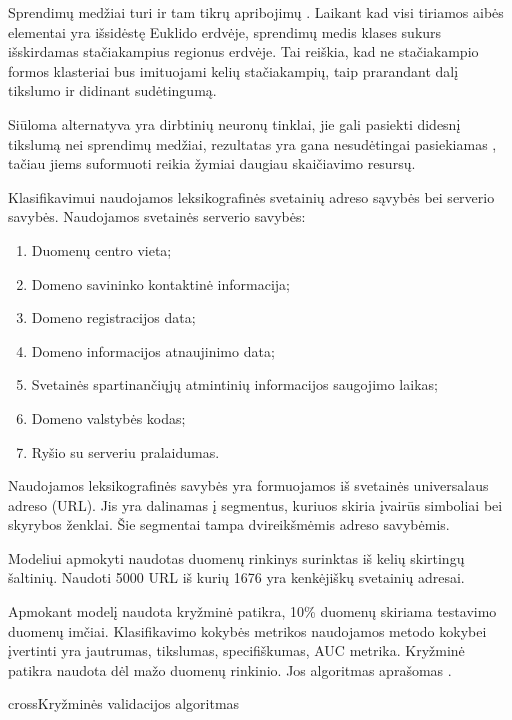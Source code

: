 Sprendimų medžiai turi ir tam tikrų apribojimų \cite{c45}. Laikant kad visi tiriamos aibės elementai yra išsidėstę Euklido erdvėje, sprendimų medis klases sukurs išskirdamas stačiakampius regionus erdvėje. Tai reiškia, kad ne stačiakampio formos klasteriai bus imituojami kelių stačiakampių, taip prarandant dalį tikslumo ir didinant sudėtingumą.

Siūloma alternatyva \cite{c45} yra dirbtinių neuronų tinklai, jie gali pasiekti didesnį tikslumą nei sprendimų medžiai, rezultatas yra gana nesudėtingai pasiekiamas \cite{c45}, tačiau jiems suformuoti reikia žymiai daugiau skaičiavimo resursų.

Klasifikavimui naudojamos leksikografinės svetainių adreso sąvybės bei serverio savybės. Naudojamos svetainės serverio savybės:
\begin{enumerate}[label=\arabic*.]
    \item Duomenų centro vieta;
    \item Domeno savininko kontaktinė informacija;
    \item Domeno registracijos data;
    \item Domeno informacijos atnaujinimo data;
    \item Svetainės spartinančiųjų atmintinių informacijos saugojimo laikas;
    \item Domeno valstybės kodas;
    \item Ryšio su serveriu pralaidumas.
\end{enumerate}

Naudojamos leksikografinės savybės yra formuojamos iš svetainės universalaus adreso (URL). Jis yra dalinamas į segmentus, kuriuos skiria įvairūs simboliai bei skyrybos ženklai. Šie segmentai tampa dvireikšmėmis adreso savybėmis.

Modeliui apmokyti naudotas duomenų rinkinys surinktas iš kelių skirtingų šaltinių. Naudoti 5000 URL iš kurių 1676 yra kenkėjiškų svetainių adresai.

Apmokant modelį naudota kryžminė patikra, 10\% duomenų skiriama testavimo duomenų imčiai. Klasifikavimo kokybės metrikos naudojamos metodo kokybei įvertinti yra jautrumas, tikslumas, specifiškumas, AUC metrika. Kryžminė patikra naudota dėl mažo duomenų rinkinio. Jos algoritmas aprašomas .

\begin{ktualgo}{cross}{Kryžminės validacijos algoritmas}
    \EndFor{}
\end{ktualgo}

